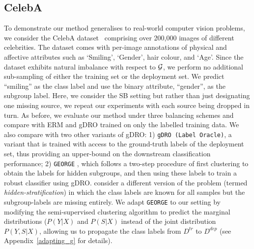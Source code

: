 
\subsection{CelebA}\label{ssec:celeba_exp}
%

%
To demonstrate our method generalises to real-world computer vision problems, we consider the
CelebA dataset~\cite{liu2015celeba} comprising over 200,000 images of different celebrities. The
dataset comes with per-image annotations of physical and affective attributes such as `Smiling',
`Gender', hair colour, and `Age'.
%
Since the dataset exhibits natural imbalance with respect to ${\mathcal{G}}$, we perform no additional
sub-sampling of either the training set or the deployment set. We predict ``smiling'' as the class
label and use the binary attribute, ``gender'', as the subgroup label. Here, we consider the SB
setting but rather than just designating one missing source, we repeat our experiments with each
source being dropped in turn.
%
As before, we evaluate our method under three balancing schemes and compare with ERM and gDRO
trained on only the labelled training data.
%
We also compare with two other variants of gDRO: 1) \texttt{gDRO (Label Oracle)}, a variant that is
trained with access to the ground-truth labels of the deployment set, thus providing an upper-bound
on the downstream classification performance; 2) \texttt{GEORGE} \citep{SohDunAngGuetal20}, which
follows a two-step procedure of first clustering to obtain the labels for hidden subgroups, and
then using these labels to train a robust classifier using gDRO.
%
\citet{SohDunAngGuetal20} consider a different version of the problem (termed
\emph{hidden-stratification}) in which the class labels are known for all samples but the
subgroup-labels are missing entirely.
%
We adapt \texttt{GEORGE} to our setting by modifying the semi-supervised clustering algorithm to
predict the marginal distributions (\(P(Y|X)\) and \(P(S|X)\) instead of the joint distribution
\(P(Y, S|X)\), allowing us to propagate the class labels from \( D^{tr} \) to \( D^{dep} \) (see
Appendix~\ref{adapting_g} for details).


